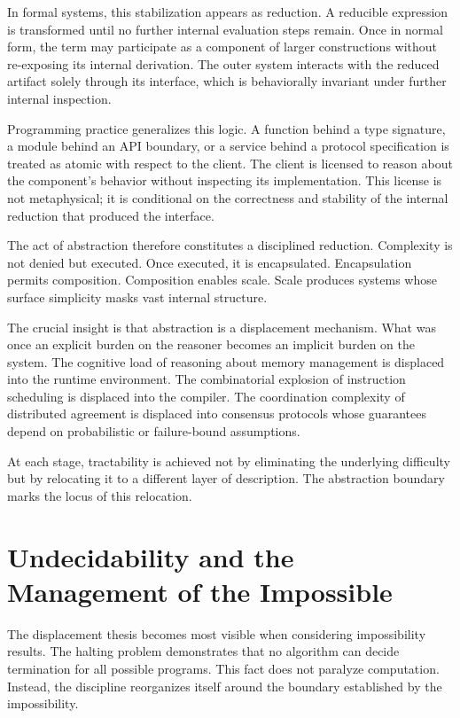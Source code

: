 \documentclass[11pt]{article}
\begin{document}
In formal systems, this stabilization appears as reduction. A reducible expression is transformed until no further internal evaluation steps remain. Once in normal form, the term may participate as a component of larger constructions without re-exposing its internal derivation. The outer system interacts with the reduced artifact solely through its interface, which is behaviorally invariant under further internal inspection.

Programming practice generalizes this logic. A function behind a type signature, a module behind an API boundary, or a service behind a protocol specification is treated as atomic with respect to the client. The client is licensed to reason about the component's behavior without inspecting its implementation. This license is not metaphysical; it is conditional on the correctness and stability of the internal reduction that produced the interface.

The act of abstraction therefore constitutes a disciplined reduction. Complexity is not denied but executed. Once executed, it is encapsulated. Encapsulation permits composition. Composition enables scale. Scale produces systems whose surface simplicity masks vast internal structure.

The crucial insight is that abstraction is a displacement mechanism. What was once an explicit burden on the reasoner becomes an implicit burden on the system. The cognitive load of reasoning about memory management is displaced into the runtime environment. The combinatorial explosion of instruction scheduling is displaced into the compiler. The coordination complexity of distributed agreement is displaced into consensus protocols whose guarantees depend on probabilistic or failure-bound assumptions.

At each stage, tractability is achieved not by eliminating the underlying difficulty but by relocating it to a different layer of description. The abstraction boundary marks the locus of this relocation.

\section{Undecidability and the Management of the Impossible}

The displacement thesis becomes most visible when considering impossibility results. The halting problem demonstrates that no algorithm can decide termination for all possible programs. This fact does not paralyze computation. Instead, the discipline reorganizes itself around the boundary established by the impossibility.
\end{document}
